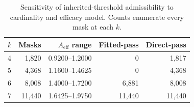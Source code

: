 \begin{table}[htbp]\centering
\caption{Sensitivity of inherited-threshold admissibility to cardinality and efficacy model. Counts enumerate every mask at each $k$.}\label{tab:cardinality}
\small
\setlength{\tabcolsep}{4pt}
\begin{tabular}{lrrrr}\toprule
$k$ & Masks & $A_{\mathrm{eff}}$ range & Fitted-pass & Direct-pass \\ \midrule
4 & 1,820 & 0.9200--1.2000 & 0 & 1,817 \\
5 & 4,368 & 1.1600--1.4625 & 0 & 4,368 \\
6 & 8,008 & 1.4000--1.7200 & 6,881 & 8,008 \\
7 & 11,440 & 1.6425--1.9750 & 11,440 & 11,440 \\
\bottomrule\end{tabular}
\end{table}
